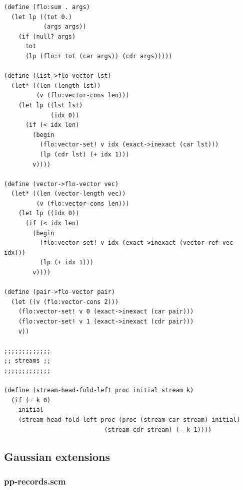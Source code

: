 \documentclass{article}
\begin{document}
\begin{verbatim}
(define (flo:sum . args)
  (let lp ((tot 0.)
           (args args))
    (if (null? args)
      tot
      (lp (flo:+ tot (car args)) (cdr args)))))

(define (list->flo-vector lst)
  (let* ((len (length lst))
         (v (flo:vector-cons len)))
    (let lp ((lst lst)
             (idx 0))
      (if (< idx len)
        (begin
          (flo:vector-set! v idx (exact->inexact (car lst)))
          (lp (cdr lst) (+ idx 1)))
        v))))

(define (vector->flo-vector vec)
  (let* ((len (vector-length vec))
         (v (flo:vector-cons len)))
    (let lp ((idx 0))
      (if (< idx len)
        (begin
          (flo:vector-set! v idx (exact->inexact (vector-ref vec idx)))
          (lp (+ idx 1)))
        v))))

(define (pair->flo-vector pair)
  (let ((v (flo:vector-cons 2)))
    (flo:vector-set! v 0 (exact->inexact (car pair)))
    (flo:vector-set! v 1 (exact->inexact (cdr pair)))
    v))

;;;;;;;;;;;;;
;; streams ;;
;;;;;;;;;;;;;

(define (stream-head-fold-left proc initial stream k)
  (if (= k 0)
    initial
    (stream-head-fold-left proc (proc (stream-car stream) initial)
                            (stream-cdr stream) (- k 1))))
\end{verbatim}

\subsection{Gaussian extensions}
\label{sec:gaussian-extensions}

\subsubsection{pp-records.scm}
\end{document}
